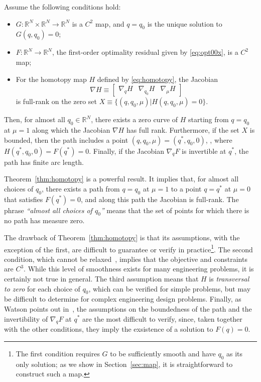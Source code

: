 \begin{theorem}\label{thm:homotopy}
  Assume the following conditions hold:
  \begin{itemize}
  \item $G : \mathbb{R}^{N} \times \mathbb{R}^{N} \rightarrow \mathbb{R}^{N}$ is
    a $C^2$ map, and $q=q_0$ is the unique solution to $G(q,q_0) = 0$;    
  \item $F :\mathbb{R}^{N} \rightarrow \mathbb{R}^{N}$, the first-order
    optimality residual given by \eqref{eq:opt00x}, is a $C^2$ map;
  \item For the homotopy map $H$ defined by \eqref{eq:homotopy}, the Jacobian 
  \begin{equation*}
    \nabla H \equiv \begin{bmatrix} \nabla_q H & \nabla_{q_0} H & \nabla_\mu
    H \end{bmatrix}
  \end{equation*}   
     is full-rank on the zero set $X \equiv \{(q,q_0,\mu) |
    H(q,q_0,\mu) = 0 \}$.
  \end{itemize}
  Then, for almost all $q_0 \in \mathbb{R}^{N}$, there exists a zero curve of
  $H$ starting from $q=q_0$ at $\mu=1$ along which the Jacobian $\nabla H$ has
  full rank.  Furthermore, if the set $X$ is bounded, then the path includes a
  point $(q,q_0,\mu) = (q^*,q_0,0)$, \ie, where $H(q^{*},q_0,0) = F(q^{*}) = 0$.
  Finally, if the Jacobian $\nabla_q F$ is invertible at $q^{*}$, the path has
  finite arc length.
\end{theorem}

Theorem~\ref{thm:homotopy} is a powerful result.  It implies that, for almost
all choices of $q_0$, there exists a path from $q=q_0$ at $\mu=1$ to a point
$q=q^*$ at $\mu=0$ that satisfies $F(q^*) = 0$, and along this path the Jacobian
is full-rank.  The phrase \emph{``almost all choices of $q_0$''} means that the
set of points for which there is no path has measure zero.

The drawback of Theorem~\ref{thm:homotopy} is that its assumptions, with the
exception of the first, are difficult to guarantee or verify in
practice\footnote{The first condition requires $G$ to be sufficiently smooth and
  have $q_0$ as its only solution; as we show in Section~\ref{sec:map}, it is
  straightforward to construct such a map.}.  The second condition, which cannot
be relaxed~\cite{watson_2002}, implies that the objective and constraints are
$C^3$.  While this level of smoothness exists for many engineering problems, it
is certainly not true in general.  The third assumption means that $H$ is
\emph{transversal to zero} for each choice of $q_0$, which can be verified for
simple problems, but may be difficult to determine for complex engineering
design problems.  Finally, as Watson points out in~\cite{watson_2002}, the
assumptions on the boundedness of the path and the invertibility of $\nabla_q F$
at $q^{*}$ are the most difficult to verify, since, taken together with the
other conditions, they imply the exsistence of a solution to $F(q) = 0$.

